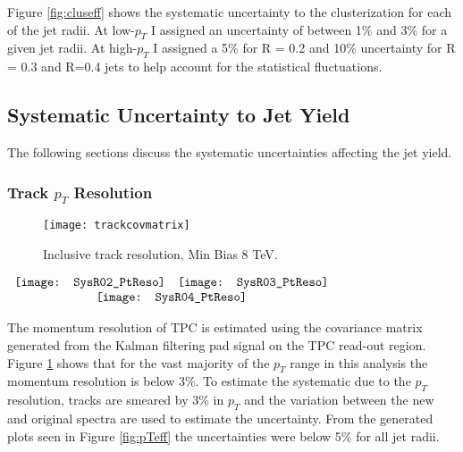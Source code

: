 Figure \ref{fig:cluseff} shows the systematic uncertainty to the clusterization for each of the jet radii.  At low-$p_{T}$ I assigned an uncertainty of between 1\% and 3\% for a given jet radii.  At high-$p_{T}$ I assigned a 5\% for R = 0.2 and 10\% uncertainty for R = 0.3 and R=0.4 jets to help account for the statistical fluctuations.

\subsection{Systematic Uncertainty to Jet Yield}

The following sections discuss the systematic uncertainties affecting the jet yield.

\subsubsection{Track $p_{T}$ Resolution}

\begin{figure}[h]
\texttt{[image: trackcovmatrix]}
\centering
\caption{Inclusive track resolution, Min Bias 8 TeV.}
\label{fig:trackpcovmatrix}
\end{figure}

\begin{figure*}[t!]
$\begin{array}{rl}
    \texttt{[image: SysR02\_PtReso]} &
    \texttt{[image: SysR03\_PtReso]}\\
    \multicolumn{2}{c}{\texttt{[image: SysR04\_PtReso]}}
\end{array}$
\caption[Systematic due to $P_{T}$ resolution.]{\label{fig:pTeff}$P_{T}$ resolution systematic; R = 0.2 \textit{(top left)}, R = 0.3 \textit{(top right)}, R = 0.4 \textit{(bottom)}.}
\end{figure*}

\noindent
The momentum resolution of TPC is estimated using the covariance matrix generated from the Kalman filtering\cite{Fruhwirth:1987fm} pad signal on the TPC read-out region.  Figure \ref{fig:trackpcovmatrix} shows that for the vast majority of the $p_{T}$ range in this analysis the  momentum resolution is below 3\%.  To estimate the systematic due to the $p_{T}$ resolution, tracks are smeared by 3\% in $p_{T}$ and the variation between the new and original spectra are used to estimate the uncertainty.  From the generated plots seen in Figure \ref{fig:pTeff} the uncertainties were below 5\% for all jet radii.

